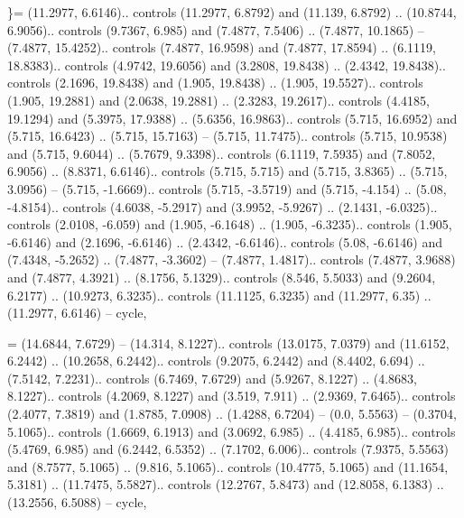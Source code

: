 \}= {(11.2977, 6.6146).. controls (11.2977, 6.8792) and (11.139, 6.8792) .. (10.8744, 6.9056).. controls (9.7367, 6.985) and (7.4877, 7.5406) .. (7.4877, 10.1865) -- (7.4877, 15.4252).. controls (7.4877, 16.9598) and (7.4877, 17.8594) .. (6.1119, 18.8383).. controls (4.9742, 19.6056) and (3.2808, 19.8438) .. (2.4342, 19.8438).. controls (2.1696, 19.8438) and (1.905, 19.8438) .. (1.905, 19.5527).. controls (1.905, 19.2881) and (2.0638, 19.2881) .. (2.3283, 19.2617).. controls (4.4185, 19.1294) and (5.3975, 17.9388) .. (5.6356, 16.9863).. controls (5.715, 16.6952) and (5.715, 16.6423) .. (5.715, 15.7163) -- (5.715, 11.7475).. controls (5.715, 10.9538) and (5.715, 9.6044) .. (5.7679, 9.3398).. controls (6.1119, 7.5935) and (7.8052, 6.9056) .. (8.8371, 6.6146).. controls (5.715, 5.715) and (5.715, 3.8365) .. (5.715, 3.0956) -- (5.715, -1.6669).. controls (5.715, -3.5719) and (5.715, -4.154) .. (5.08, -4.8154).. controls (4.6038, -5.2917) and (3.9952, -5.9267) .. (2.1431, -6.0325).. controls (2.0108, -6.059) and (1.905, -6.1648) .. (1.905, -6.3235).. controls (1.905, -6.6146) and (2.1696, -6.6146) .. (2.4342, -6.6146).. controls (5.08, -6.6146) and (7.4348, -5.2652) .. (7.4877, -3.3602) -- (7.4877, 1.4817).. controls (7.4877, 3.9688) and (7.4877, 4.3921) .. (8.1756, 5.1329).. controls (8.546, 5.5033) and (9.2604, 6.2177) .. (10.9273, 6.3235).. controls (11.1125, 6.3235) and (11.2977, 6.35) .. (11.2977, 6.6146) -- cycle},

\ctptilde = {(14.6844, 7.6729) -- (14.314, 8.1227).. controls (13.0175, 7.0379) and (11.6152, 6.2442) .. (10.2658, 6.2442).. controls (9.2075, 6.2442) and (8.4402, 6.694) .. (7.5142, 7.2231).. controls (6.7469, 7.6729) and (5.9267, 8.1227) .. (4.8683, 8.1227).. controls (4.2069, 8.1227) and (3.519, 7.911) .. (2.9369, 7.6465).. controls (2.4077, 7.3819) and (1.8785, 7.0908) .. (1.4288, 6.7204) -- (0.0, 5.5563) -- (0.3704, 5.1065).. controls (1.6669, 6.1913) and (3.0692, 6.985) .. (4.4185, 6.985).. controls (5.4769, 6.985) and (6.2442, 6.5352) .. (7.1702, 6.006).. controls (7.9375, 5.5563) and (8.7577, 5.1065) .. (9.816, 5.1065).. controls (10.4775, 5.1065) and (11.1654, 5.3181) .. (11.7475, 5.5827).. controls (12.2767, 5.8473) and (12.8058, 6.1383) .. (13.2556, 6.5088) -- cycle},
